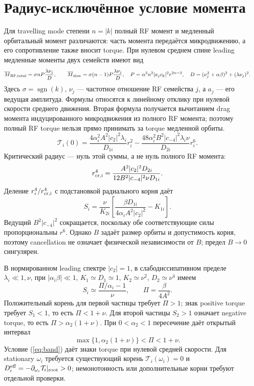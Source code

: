 \documentclass[aip,cha,reprint,amsmath,amssymb]{revtex4-2}
\begin{document}
\section{Радиус-исключённое условие момента}
Для travelling mode степени $n=|k|$ полный RF момент и медленный орбитальный момент различаются: часть момента передаётся микродвижению, а его сопротивление также вносит torque. При нулевом среднем спине leading медленные моменты двух семейств имеют вид
\begin{equation}
\overline M_{\rm RF,total}=\sigma nP\frac{\lambda\nu_j}{D},\qquad
\overline M_{\rm slow}=\sigma(n-1)P\frac{\lambda\nu_j}{D},
\quad P=\alpha^2n^2|a_jc_k|^2r^{2n-2},\quad
D=(\nu_j^2+\alpha\beta)^2+(\lambda\nu_j)^2.
\end{equation}
Здесь $\sigma=\operatorname{sgn}(k)$, $\nu_j$ — частотное отношение RF семейства $j$, а $a_j$ — его ведущая амплитуда. Формулы относятся к линейному отклику при нулевой скорости среднего движения. Вторая формула получается вычитанием drag момента индуцированного микродвижения из полного RF момента; поэтому полный RF torque нельзя прямо принимать за torque медленной орбиты.
\begin{equation}
\mathcal T_i(0)=\frac{4\alpha_i^2 A^2|c_2|^2\lambda_i}{D_{1i}}r_i^2
-\frac{48\alpha_i^2 B^2|c_{-4}|^2\lambda_i\nu}{D_{2i}}r_i^6.
\end{equation}
Критический радиус — нуль этой суммы, а не нуль полного RF момента:
\begin{equation}
r_{\rm cr,i}^4=\frac{A^2|c_2|^2D_{2i}}
{12B^2|c_{-4}|^2\nu D_{1i}}.
\end{equation}
Деление $r_i^4/r_{\rm cr,i}^4$ с подстановкой радиального корня даёт
\begin{equation}
S_i=\frac{\nu}{K_{2i}}\left[
\frac{\beta D_{1i}}{4\alpha_i A^2|c_2|^2}-K_{1i}\right].
\label{eq:S}
\end{equation}
Ведущий $B^2|c_{-4}|^2$ сокращается, поскольку обе соответствующие силы пропорциональны $r^6$. Однако $B$ задаёт размер орбиты и допустимость корня, поэтому cancellation не означает физической независимости от $B$; предел $B\to0$ сингулярен.

В нормированном leading спектре $|c_2|=1$, в слабодиссипативном пределе $\lambda_i\ll1,\nu$, при $|\alpha_i\beta|\ll1$, $K_1\simeq D_1\simeq1$, $K_2\simeq\nu^2$, $D_2\simeq\nu^4$ имеем
\begin{equation}
S_i\simeq\frac{\Pi/\alpha_i-1}{\nu},\qquad \Pi=\frac{\beta}{4A^2}.
\end{equation}
Положительный корень для первой частицы требует $\Pi>1$; знак positive torque требует $S_1<1$, то есть $\Pi<1+\nu$. Для второй частицы $S_2>1$ означает negative torque, то есть $\Pi>\alpha_2(1+\nu)$. При $0<\alpha_2<1$ пересечение даёт открытый интервал
\begin{equation}
\boxed{\max\{1,\alpha_2(1+\nu)\}<\Pi<1+\nu.}
\label{eq:band}
\end{equation}
Условие (\ref{eq:band}) даёт знаки torque при нулевой средней скорости. Для stationary $\omega_i$ требуется существующий корень $\mathcal T_i(\omega_i)=0$ и $D_i^{\rm eff}=-\partial_{\omega_i}\mathcal T_i|_{\rm root}>0$; немонотонность или дополнительные корни требуют отдельной проверки.
\end{document}
